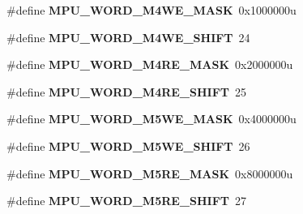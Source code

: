 \begin{DoxyCompactItemize}
\item 
\hypertarget{group___m_p_u___register___masks_gac3a983687d94df3019c562fa26c8d07e}{}\#define {\bfseries M\+P\+U\+\_\+\+W\+O\+R\+D\+\_\+\+M4\+W\+E\+\_\+\+M\+A\+S\+K}~0x1000000u\label{group___m_p_u___register___masks_gac3a983687d94df3019c562fa26c8d07e}

\item 
\hypertarget{group___m_p_u___register___masks_gaa32f6731588dff2a7e5ee20e10a86937}{}\#define {\bfseries M\+P\+U\+\_\+\+W\+O\+R\+D\+\_\+\+M4\+W\+E\+\_\+\+S\+H\+I\+F\+T}~24\label{group___m_p_u___register___masks_gaa32f6731588dff2a7e5ee20e10a86937}

\item 
\hypertarget{group___m_p_u___register___masks_ga529413212f8c7cf7bd2d1ab6a050d1c8}{}\#define {\bfseries M\+P\+U\+\_\+\+W\+O\+R\+D\+\_\+\+M4\+R\+E\+\_\+\+M\+A\+S\+K}~0x2000000u\label{group___m_p_u___register___masks_ga529413212f8c7cf7bd2d1ab6a050d1c8}

\item 
\hypertarget{group___m_p_u___register___masks_ga72594f986e13433ed74e6eabfacf5253}{}\#define {\bfseries M\+P\+U\+\_\+\+W\+O\+R\+D\+\_\+\+M4\+R\+E\+\_\+\+S\+H\+I\+F\+T}~25\label{group___m_p_u___register___masks_ga72594f986e13433ed74e6eabfacf5253}

\item 
\hypertarget{group___m_p_u___register___masks_ga918f8ced0f8de1a54cc59c57328a18f3}{}\#define {\bfseries M\+P\+U\+\_\+\+W\+O\+R\+D\+\_\+\+M5\+W\+E\+\_\+\+M\+A\+S\+K}~0x4000000u\label{group___m_p_u___register___masks_ga918f8ced0f8de1a54cc59c57328a18f3}

\item 
\hypertarget{group___m_p_u___register___masks_gaa25703033160cedcbc90416722c87fc9}{}\#define {\bfseries M\+P\+U\+\_\+\+W\+O\+R\+D\+\_\+\+M5\+W\+E\+\_\+\+S\+H\+I\+F\+T}~26\label{group___m_p_u___register___masks_gaa25703033160cedcbc90416722c87fc9}

\item 
\hypertarget{group___m_p_u___register___masks_ga04e6c19c601a7bd3dd87a889f309a9f4}{}\#define {\bfseries M\+P\+U\+\_\+\+W\+O\+R\+D\+\_\+\+M5\+R\+E\+\_\+\+M\+A\+S\+K}~0x8000000u\label{group___m_p_u___register___masks_ga04e6c19c601a7bd3dd87a889f309a9f4}

\item 
\hypertarget{group___m_p_u___register___masks_gaa33945bb1d9469089a504d285a8dc021}{}\#define {\bfseries M\+P\+U\+\_\+\+W\+O\+R\+D\+\_\+\+M5\+R\+E\+\_\+\+S\+H\+I\+F\+T}~27\label{group___m_p_u___register___masks_gaa33945bb1d9469089a504d285a8dc021}


\end{DoxyCompactItemize}
